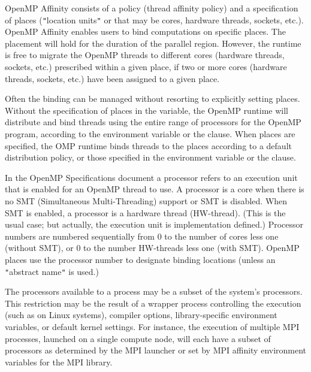 \label{chap:openmp_affinity}

OpenMP Affinity consists of a  policy (thread affinity policy) and a specification of
places (\texttt{"}location units\texttt{"} or  that may be cores, hardware
threads, sockets, etc.).  
OpenMP Affinity enables users to bind computations on specific places.
The placement will hold for the duration of the parallel region. 
However, the runtime is free to migrate the OpenMP threads 
to different cores (hardware threads, sockets, etc.) prescribed within a given place, 
if two or more cores (hardware threads, sockets, etc.) have been assigned to a given place.

Often the binding can be managed without resorting to explicitly setting places.
Without the specification of places in the  variable, 
the OpenMP runtime will distribute and bind threads using the entire range of processors for 
the OpenMP program, according to the  environment variable
or the  clause.  When places are specified, the OMP runtime
binds threads to the places according to a default distribution policy, or
those specified in the  environment variable or the
 clause.

In the OpenMP Specifications document a processor refers to an execution unit that
is enabled for an OpenMP thread to use.  A processor is a core when there is
no SMT (Simultaneous Multi-Threading) support or SMT is disabled.  When 
SMT is enabled, a processor is a hardware thread (HW-thread). (This is the
usual case; but actually, the execution unit is implementation defined.) Processor
numbers are numbered sequentially from 0 to the number of cores less one (without SMT), or
0 to the number HW-threads less one (with SMT). OpenMP places use the processor number to designate
binding locations (unless an \texttt{"}abstract name\texttt{"} is used.) 


The processors available to a process may be a subset of the system's
processors.  This restriction may be the result of a 
wrapper process controlling the execution (such as  on Linux systems), 
compiler options, library-specific environment variables, or default
kernel settings.  For instance, the execution of multiple MPI processes,
launched on a single compute node, will each have a subset of processors as
determined by the MPI launcher or set by MPI affinity environment 
variables for the MPI library.  %

